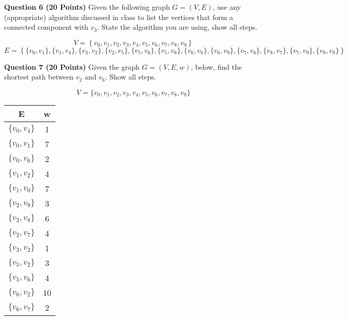 \documentclass{letter}
\begin{document}
\clearpage

{\bf Question 6 (20 Points)} \kern 0.5cm Given the following graph $G=(V,E)$, use
any (appropriate) algorithm discussed in class to list the vertices that form a
connected component with $v_3$.  State the algorithm you are using, show all
steps.

\begin{equation*}
V = \left \{ v_0, v_1, v_2, v_3, v_4, v_5, v_6, v_7, v_8, v_9 \right \}
\end{equation*}
\begin{equation*}
E = \left \{ \{v_0,v_1\},\{v_1,v_4\},\{v_3,v_2\},\{v_2,v_5\},\{v_5,v_6\},\{v_5,v_8\},\{v_6,v_8\},\{v_6,v_9\},\{v_7,v_6\},\{v_8,v_7\},\{v_7,v_9\},\{v_9,v_8\} \right \}
\end{equation*}

\clearpage

{\bf Question 7 (20 Points)} \kern 0.5cm Given the graph $G = (V, E, w)$, below,
find the shortest path between $v_2$ and $v_6$.  Show all steps.

\begin{equation*}
V = \{ v_0, v_1, v_2, v_3, v_4, v_5, v_6, v_7, v_8, v_9 \}
\end{equation*}

\begin{tabular}{ c | c }
E & w \\ \hline
$\{v_0,v_4\}$ & 1 \\
$\{v_0,v_1\}$ & 7 \\
$\{v_0,v_6\}$ & 2 \\
$\{v_1,v_2\}$ & 4 \\
$\{v_1,v_0\}$ & 7 \\
$\{v_2,v_9\}$ & 3 \\
$\{v_2,v_8\}$ & 6 \\
$\{v_2,v_7\}$ & 4 \\
$\{v_3,v_2\}$ & 1 \\
$\{v_5,v_2\}$ & 3 \\
$\{v_5,v_6\}$ & 4 \\
$\{v_6,v_2\}$ & 10 \\
$\{v_6,v_7\}$ & 2 \\
\end{tabular}

\clearpage
\end{document}
